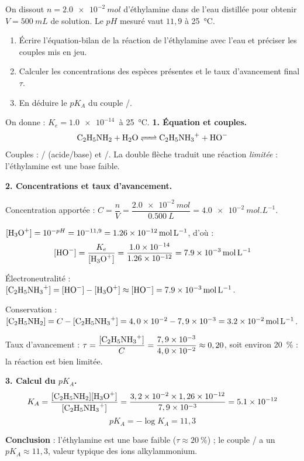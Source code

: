 \documentclass[11pt]{article}
\begin{document}
\begin{exoresolu}
On dissout $n = \SI{2,0e-2}{mol}$ d'éthylamine  dans de l'eau distillée pour obtenir $V = \SI{500}{mL}$ de solution. Le $pH$ mesuré vaut $11,9$ à \SI{25}{\celsius}.
\begin{enumerate}
\item Écrire l'équation-bilan de la réaction de l'éthylamine avec l'eau et préciser les couples mis en jeu.
\item Calculer les concentrations des espèces présentes et le taux d'avancement final $\tau$.
\item En déduire le $pK_A$ du couple /.
\end{enumerate}
On donne : $K_e = \SI{1,0e-14}{}$ à \SI{25}{\celsius}.
\tcblower
\textbf{1. Équation et couples.}
\[ \ce{C2H5NH2 + H2O <=> C2H5NH3+ + HO-} \]
Couples : / (acide/base) et /. La double flèche traduit une réaction \emph{limitée} : l'éthylamine est une base faible.

\textbf{2. Concentrations et taux d'avancement.}

Concentration apportée : $C = \dfrac{n}{V} = \dfrac{\SI{2,0e-2}{mol}}{\SI{0,500}{L}} = \SI{4,0e-2}{mol.L^{-1}}$.

$[\ce{H3O+}] = 10^{-pH} = 10^{-11,9} = \SI{1,26e-12}{mol.L^{-1}}$, d'où :
\[ [\ce{HO-}] = \frac{K_e}{[\ce{H3O+}]} = \frac{\SI{1,0e-14}{}}{\SI{1,26e-12}{}} = \SI{7,9e-3}{mol.L^{-1}} \]

Électroneutralité : $[\ce{C2H5NH3+}] = [\ce{HO-}] - [\ce{H3O+}] \approx [\ce{HO-}] = \SI{7,9e-3}{mol.L^{-1}}$.

Conservation : $[\ce{C2H5NH2}] = C - [\ce{C2H5NH3+}] = 4,0\times10^{-2} - 7,9\times10^{-3} = \SI{3,2e-2}{mol.L^{-1}}$.

Taux d'avancement : $\tau = \dfrac{[\ce{C2H5NH3+}]}{C} = \dfrac{7,9\times10^{-3}}{4,0\times10^{-2}} \approx 0,20$, soit environ \SI{20}{\%} : la réaction est bien limitée.

\textbf{3. Calcul du $pK_A$.}
\[ K_A = \frac{[\ce{C2H5NH2}][\ce{H3O+}]}{[\ce{C2H5NH3+}]} = \frac{3,2\times10^{-2}\times 1,26\times10^{-12}}{7,9\times10^{-3}} = \SI{5,1e-12}{} \]
\[ pK_A = -\log K_A = 11,3 \]

\textbf{Conclusion} : l'éthylamine est une base faible ($\tau \approx \SI{20}{\%}$) ; le couple / a un $pK_A \approx 11,3$, valeur typique des ions alkylammonium.
\end{exoresolu}
\end{document}

